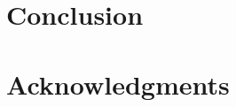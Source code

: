 \documentclass[conference]{IEEEtran}
\begin{document}
\section{Conclusion}

\section*{Acknowledgments}

\begin{thebibliography}{00}
\end{thebibliography}

\vspace{12pt}
\end{document}

